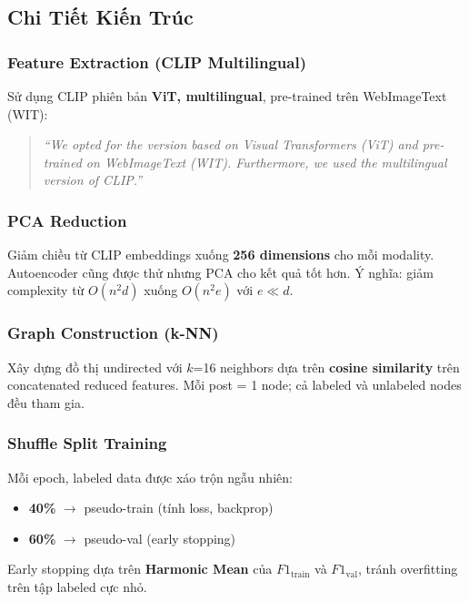 \documentclass[12pt,a4paper]{article}
\begin{document}
\subsection{Chi Tiết Kiến Trúc}

\subsubsection{Feature Extraction (CLIP Multilingual)}
Sử dụng CLIP phiên bản \textbf{ViT, multilingual}, pre-trained trên WebImageText (WIT):
\begin{quote}
\textit{``We opted for the version based on Visual Transformers (ViT) and pre-trained on WebImageText (WIT). Furthermore, we used the multilingual version of CLIP.''}
\end{quote}

\subsubsection{PCA Reduction}
Giảm chiều từ CLIP embeddings xuống \textbf{256 dimensions} cho mỗi modality. Autoencoder cũng được thử nhưng PCA cho kết quả tốt hơn. Ý nghĩa: giảm complexity từ $O(n^2 d)$ xuống $O(n^2 e)$ với $e \ll d$.

\subsubsection{Graph Construction (k-NN)}
Xây dựng đồ thị undirected với $k$=16 neighbors dựa trên \textbf{cosine similarity} trên concatenated reduced features. Mỗi post = 1 node; cả labeled và unlabeled nodes đều tham gia.

\subsubsection{Shuffle Split Training}
\begin{insightbox}
Mỗi epoch, labeled data được xáo trộn ngẫu nhiên:
\begin{itemize}
  \item \textbf{40\%} $\rightarrow$ pseudo-train (tính loss, backprop)
  \item \textbf{60\%} $\rightarrow$ pseudo-val (early stopping)
\end{itemize}
Early stopping dựa trên \textbf{Harmonic Mean} của $F1_{\text{train}}$ và $F1_{\text{val}}$, tránh overfitting trên tập labeled cực nhỏ.
\end{insightbox}
\end{document}
